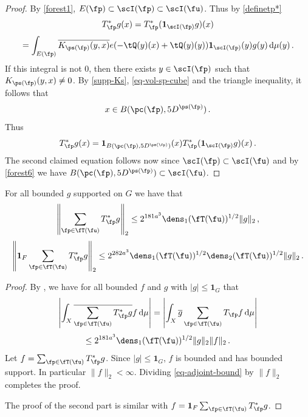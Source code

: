 \begin{proof}
    \leanok
    By \eqref{forest1}, $E(\fp) \subset \scI(\fp) \subset \scI(\fu)$. Thus by \eqref{definetp*}
    $$
         T_{\fp}^* g(x) = T_{\fp}^* (\mathbf{1}_{\scI(\fp)} g)(x)
    $$
    $$
        = \int_{E(\fp)} \overline{K_{\ps(\fp)}(y,x)} e(-\tQ(y)(x) + \tQ(y)(y)) \mathbf{1}_{\scI(\fp)}(y) g(y) \, \mathrm{d}\mu(y)\,.
    $$
    If this integral is not $0$, then there exists $y \in \scI(\fp)$ such that $K_{\ps(\fp)}(y,x) \ne 0$. By \eqref{supp-Ks}, \eqref{eq-vol-sp-cube} and the triangle inequality, it follows that
    \begin{equation*}
        x \in B(\pc(\fp), 5 D^{\ps(\fp)})\, .
    \end{equation*}
    Thus
    $$
        T_{\fp}^* g(x) = \mathbf{1}_{B(\pc(\fp), 5D^{\ps(\fp)})}(x) T_{\fp}^* (\mathbf{1}_{\scI(\fp)} g)(x)\,.
    $$
    The second claimed equation follows now since $\scI(\fp) \subset \scI(\fu)$ and by \eqref{forest6} we have $B(\pc(\fp), 5D^{\ps(\fp)}) \subset \scI(\fu)$.
\end{proof}

\begin{lemma}
    \label{adjoint-tree-estimate}
    \leanok
    For all bounded $g$ supported on $G$ we have that
    $$
        \left\| \sum_{\fp \in \fT(\fu)} T_{\fp}^* g\right\|_2 \le 2^{181a^3} \dens_1(\fT(\fu))^{1/2} \|g\|_2\,,
    $$
    $$
        \left\| \mathbf{1}_F \sum_{\fp \in \fT(\fu)} T_{\fp}^* g\right\|_2 \le 2^{282a^3} \dens_1(\fT(\fu))^{1/2} \dens_2(\fT(\fu))^{1/2} \|g\|_2\,.
    $$
\end{lemma}

\begin{proof}
    \leanok
    By , we have for all bounded $f$ and $g$ with $|g| \le \mathbf{1}_G$ that
    $$
        \left| \int_X \overline{\sum_{\fp\in \fT(\fu)} T_{\fp}^* g} f \,\mathrm{d}\mu \right| = \left| \int_X \overline{g} \sum_{\fp \in \fT(\fu)} T_{\fp} f \,\mathrm{d}\mu \right|
    $$
    \begin{equation}
        \label{eq-adjoint-bound}
        \le 2^{181a^3} \dens_1(\fT(\fu))^{1/2} \|g\|_2 \|f\|_2\,.
    \end{equation}
    Let $f = \sum_{\fp \in \fT(\fu)} T_{\fp}^* g$. Since $|g| \le \mathbf{1}_G$, $f$ is bounded and has bounded support. In particular $\|f\|_2 < \infty$. Dividing \eqref{eq-adjoint-bound} by $\|f\|_2$ completes the proof.

    The proof of the second part is similar with $f = \mathbf{1}_F \sum_{\fp \in \fT(\fu)} T_{\fp}^* g$.
\end{proof}

